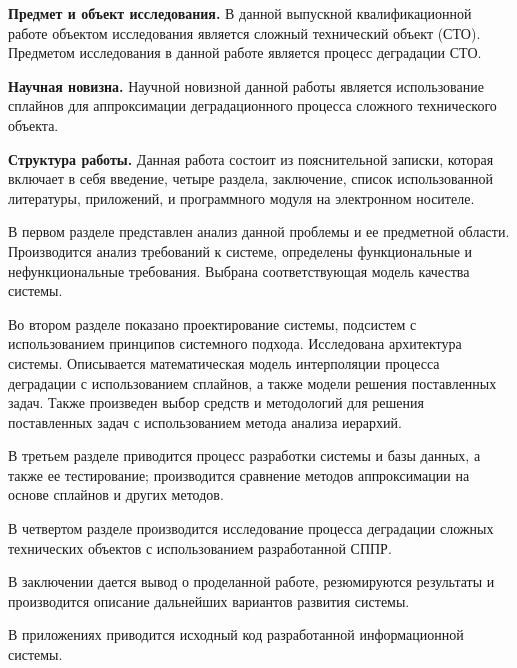 \textbf{Предмет и объект исследования.}
В данной выпускной квалификационной работе объектом исследования является сложный технический объект (СТО).
Предметом исследования в данной работе является процесс деградации СТО.

\textbf{Научная новизна.}
Научной новизной данной работы является использование сплайнов для аппроксимации деградационного процесса сложного технического объекта.

\textbf{Структура работы.}
Данная работа состоит из пояснительной записки, которая включает в себя введение, четыре раздела, заключение, список использованной литературы, приложений, и программного модуля на электронном носителе.

В первом разделе представлен анализ данной проблемы и ее предметной области. 
Производится анализ требований к системе, определены функциональные и нефункциональные требования. 
Выбрана соответствующая модель качества системы. 

Во втором разделе показано проектирование системы, подсистем с использованием принципов системного подхода. 
Исследована архитектура системы. 
Описывается математическая модель интерполяции процесса деградации с использованием сплайнов, а также модели решения поставленных задач. 
Также произведен выбор средств и методологий для решения поставленных задач с использованием метода анализа иерархий.

В третьем разделе приводится процесс разработки системы и базы данных, а также ее тестирование; производится сравнение методов аппроксимации на основе сплайнов и других методов.

В четвертом разделе производится исследование процесса деградации сложных технических объектов с использованием разработанной СППР.

В заключении дается вывод о проделанной работе, резюмируются результаты и производится описание дальнейших вариантов развития системы.

В приложениях приводится исходный код разработанной информационной системы.




